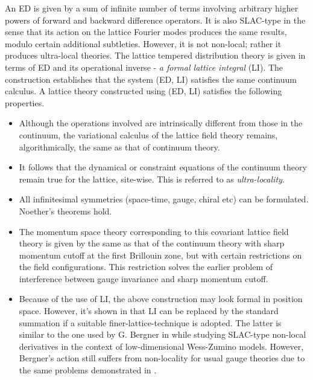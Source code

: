 \documentclass[
article,12pt]{article}
\begin{document}
An ED is given by a sum of infinite number of terms involving arbitrary higher powers of forward and backward difference operators. It is also 
SLAC-type in the sense that its action on the lattice Fourier modes produces the same results, modulo certain additional subtleties. However, it 
is not non-local; rather it produces ultra-local theories. The lattice tempered distribution theory is given in terms of ED and its operational 
inverse - {\it a formal lattice integral} (LI). The construction establishes that the system (ED, LI) satisfies the same continuum calculus. A lattice 
theory constructed using (ED, LI) satisfies the following properties.
\begin{itemize}
\item
Although the operations involved are intrinsically different from those in the continuum, the variational calculus of the lattice field theory remains, algorithmically, the same as that of continuum theory.

\item
It follows that the dynamical or constraint equations of the continuum theory remain true for the lattice, site-wise. This is referred to as {\it ultra-locality}.

\item
All infinitesimal symmetries (space-time, gauge, chiral etc) can be formulated. Noether's theorems hold. 

\item
The momentum space theory corresponding to this covariant lattice field theory is given by the same as that of the continuum theory with sharp 
momentum cutoff at the first Brillouin zone, but with certain restrictions on the field configurations. This restriction solves the earlier problem of 
interference between gauge invariance and sharp momentum cutoff. 

\item
Because of the use of LI, the above construction may look formal in position space. However, it's shown in \cite{covlatt2} that LI can be replaced by the standard summation if a suitable finer-lattice-technique is adopted. The latter is similar to the one used by G. Bergner in \cite{no-go} while studying SLAC-type non-local derivatives in the context of low-dimensional Wess-Zumino models. However, Bergner's action still suffers from non-locality for usual gauge theories due to the same problems demonstrated in \cite{karsten-smit}. 

\end{itemize}
\end{document}
